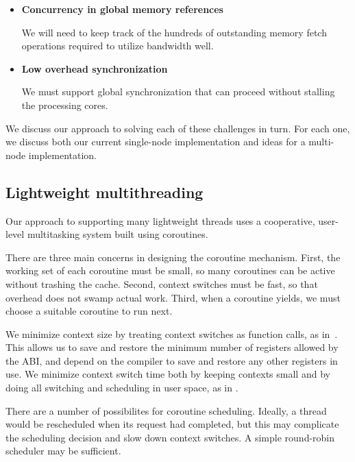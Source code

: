 \documentclass[10pt,nocopyrightspace,preprint]{sigplanconf}
\begin{document}
{\begin{itemize}
  We expect to need hundreds of
  threads to tolerate network latency, so our threading
  implementation must have low memory and context switching overheads.

\item {\bf Concurrency in global memory references}

  We will need to keep track of the hundreds of outstanding memory fetch operations required to utilize bandwidth well.

\item {\bf Low overhead synchronization}

  We must support global synchronization that can proceed without stalling the processing cores.

\end{itemize}
We discuss our approach to solving each of these challenges in
turn. For each one, we discuss both our current single-node
implementation and ideas for a multi-node implementation.

\subsection{Lightweight multithreading}

Our approach to supporting many lightweight threads uses a cooperative,
user-level multitasking system built using coroutines.

There are three main concerns in designing the coroutine
mechanism. First, the working set of each coroutine must be small, so
many coroutines can be active without trashing the cache. Second,
context switches must be fast, so that overhead does not swamp actual
work. Third, when a coroutine yields, we must choose a suitable
coroutine to run next.

We minimize context size by treating context switches as function
calls, as in~\cite{charm}. This allows us to save and restore the
minimum number of registers allowed by the ABI, and depend on the
compiler to save and restore any other registers in use. We minimize
context switch time both by keeping contexts small and by doing all
switching and scheduling in user space, as in .

There are a number of possibilites for coroutine scheduling.
Ideally, a thread would be rescheduled when its request had
completed, but this may complicate the scheduling decision and slow
down context switches. A simple round-robin scheduler may be sufficient.

}
\end{document}
